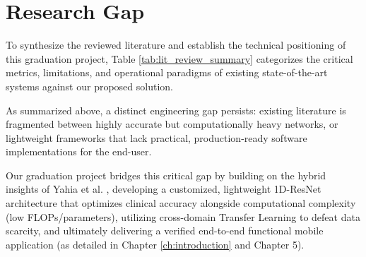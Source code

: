 \section{Research Gap}
To synthesize the reviewed literature and establish the technical positioning of this graduation project, Table \ref{tab:lit_review_summary} categorizes the critical metrics, limitations, and operational paradigms of existing state-of-the-art systems against our proposed solution.

\begin{table}[H]
\centering
\caption{Comparative Synthesis of Existing Literature vs. Our Proposed Work}
\label{tab:lit_review_summary}
\vspace{0.5em}
\end{table}

As summarized above, a distinct engineering gap persists: existing literature is fragmented between highly accurate but computationally heavy networks, or lightweight frameworks that lack practical, production-ready software implementations for the end-user. 

Our graduation project bridges this critical gap by building on the hybrid insights of Yahia et al. \cite{ta2026hybrid}, developing a customized, lightweight \mbox{1D-ResNet} architecture that optimizes clinical accuracy alongside computational complexity (low FLOPs/parameters), utilizing cross-domain Transfer Learning to defeat data scarcity, and ultimately delivering a verified end-to-end functional mobile application (as detailed in Chapter \ref{ch:introduction} and Chapter 5).